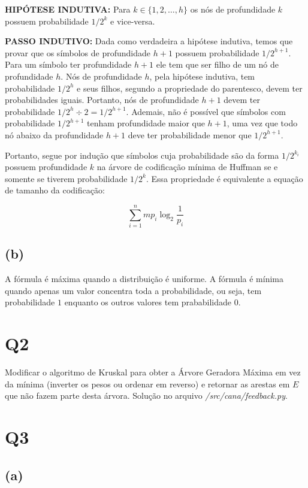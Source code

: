 \documentclass[12pt, a4paper]{article}
\begin{document}
\textbf{HIPÓTESE INDUTIVA:} Para $k \in \{1, 2, \ldots, h \}$ os nós de profundidade $k$ possuem probabilidade $1/2^k$ e vice-versa.

\textbf{PASSO INDUTIVO:} Dada como verdadeira a hipótese indutiva, temos que provar que os símbolos de profundidade $h+1$ possuem probabilidade $1/2^{h+1}$. Para um símbolo ter profundidade $h+1$ ele tem que ser filho de um nó de profundidade $h$. Nós de profundidade $h$, pela hipótese indutiva, tem probabilidade $1/2^h$ e seus filhos, segundo a propriedade do parentesco, devem ter probabilidades iguais. Portanto, nós de profundidade $h+1$ devem ter probabilidade $1/2^{h} \div 2 = 1/2^{h+1}$. Ademais, não é possível que símbolos com probabilidade $1/2^{h+1}$ tenham profundidade maior que $h+1$, uma vez que todo nó abaixo da profundidade $h+1$ deve ter probabilidade menor que $1/2^{h+1}$.

Portanto, segue por indução que símbolos cuja probabilidade são da forma $1/2^{k_i}$ possuem profundidade $k$ na árvore de codificação mínima de Huffman se e somente se tiverem probabilidade $1/2^k$. Essa propriedade é equivalente a equação de tamanho da codificação:

\[ \sum_{i=1}^{n} mp_i \log_{2}{\frac{1}{p_i}} \]

\subsection*{(b)}

A fórmula é máxima quando a distribuição é uniforme. A fórmula é mínima quando apenas um valor concentra toda a probabilidade, ou seja, tem probabilidade $1$ enquanto os outros valores tem prababilidade $0$.


\section*{Q2}

Modificar o algoritmo de Kruskal para obter a Árvore Geradora Máxima em vez da mínima (inverter os pesos ou ordenar em reverso) e retornar as arestas em $E$ que não fazem parte desta árvora. Solução no arquivo \textit{/src/cana/feedback.py}.


\section*{Q3}

\subsection*{(a)}
\end{document}
